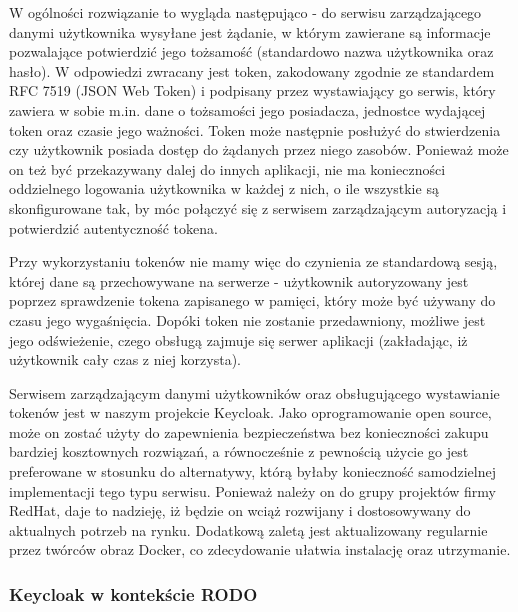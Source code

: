 \documentclass[11pt,a4paper,twoside]{article}
\begin{document}
W ogólności rozwiązanie to wygląda następująco - do serwisu zarządzającego danymi użytkownika wysyłane jest żądanie, w którym zawierane są informacje pozwalające potwierdzić jego tożsamość (standardowo nazwa użytkownika oraz hasło). W odpowiedzi zwracany jest token, zakodowany zgodnie ze standardem RFC 7519 (JSON Web Token) i podpisany przez wystawiający go serwis, który zawiera w sobie m.in. dane o tożsamości jego posiadacza,  jednostce wydającej token oraz czasie jego ważności. Token może następnie posłużyć do stwierdzenia czy użytkownik posiada dostęp do żądanych przez niego zasobów. Ponieważ może on też być przekazywany dalej do innych aplikacji, nie ma konieczności oddzielnego logowania użytkownika w każdej z nich, o ile wszystkie są skonfigurowane tak, by móc połączyć się z serwisem zarządzającym autoryzacją i potwierdzić autentyczność tokena.

Przy wykorzystaniu tokenów nie mamy więc do czynienia ze standardową sesją, której dane są przechowywane na serwerze - użytkownik autoryzowany jest poprzez sprawdzenie tokena zapisanego w pamięci, który może być używany do czasu jego wygaśnięcia. Dopóki token nie zostanie przedawniony, możliwe jest jego odświeżenie, czego obsługą zajmuje się serwer aplikacji (zakładając, iż użytkownik cały czas z niej korzysta).

Serwisem zarządzającym danymi użytkowników oraz obsługującego wystawianie tokenów jest w naszym projekcie Keycloak. Jako oprogramowanie open source, może on zostać użyty do zapewnienia bezpieczeństwa bez konieczności zakupu bardziej kosztownych rozwiązań, a równocześnie z pewnością użycie go jest preferowane w stosunku do alternatywy, którą byłaby konieczność samodzielnej implementacji tego typu serwisu. Ponieważ należy on do grupy projektów firmy RedHat, daje to nadzieję, iż będzie on wciąż rozwijany i dostosowywany do aktualnych potrzeb na rynku. Dodatkową zaletą jest aktualizowany regularnie przez twórców obraz Docker, co zdecydowanie ułatwia instalację oraz utrzymanie.

\subsubsection{Keycloak w kontekście RODO}
\end{document}
